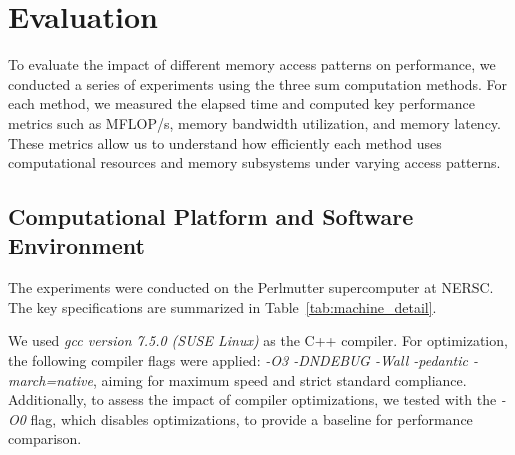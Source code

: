 \section{Evaluation}


To evaluate the impact of different memory access patterns on performance, we conducted a series of experiments using the three sum computation methods. For each method, we measured the elapsed time and computed key performance metrics such as MFLOP/s, memory bandwidth utilization, and memory latency. These metrics allow us to understand how efficiently each method uses computational resources and memory subsystems under varying access patterns.
 

\subsection{Computational Platform and Software Environment}
The experiments were conducted on the Perlmutter supercomputer at NERSC. The key specifications are summarized in Table~\ref{tab:machine_detail}.

We used \textit{gcc version 7.5.0 (SUSE Linux)} as the C++ compiler. For optimization, the following compiler flags were applied: \textit{-O3 -DNDEBUG -Wall -pedantic -march=native}, aiming for maximum speed and strict standard compliance. Additionally, to assess the impact of compiler optimizations, we tested with the \textit{-O0} flag, which disables optimizations, to provide a baseline for performance comparison.

